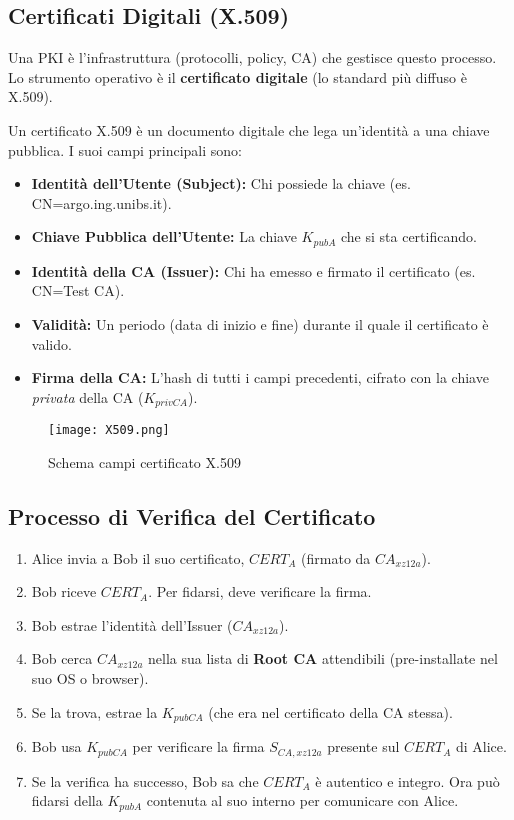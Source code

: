 \documentclass[../main.tex]{subfiles}
\begin{document}
\subsection{Certificati Digitali (X.509)}
Una PKI è l'infrastruttura (protocolli, policy, CA) che gestisce questo processo. Lo strumento operativo è il \textbf{certificato digitale} (lo standard più diffuso è X.509).

Un certificato X.509 è un documento digitale che lega un'identità a una chiave pubblica. I suoi campi principali sono:
\begin{itemize}
    \item \textbf{Identità dell'Utente (Subject):} Chi possiede la chiave (es. CN=argo.ing.unibs.it).
    \item \textbf{Chiave Pubblica dell'Utente:} La chiave $K_{pubA}$ che si sta certificando.
    \item \textbf{Identità della CA (Issuer):} Chi ha emesso e firmato il certificato (es. CN=Test CA).
    \item \textbf{Validità:} Un periodo (data di inizio e fine) durante il quale il certificato è valido.
    \item \textbf{Firma della CA:} L'hash di tutti i campi precedenti, cifrato con la chiave \emph{privata} della CA ($K_{privCA}$).
\end{itemize}

\begin{figure}[H]
  \centering
  \texttt{[image: X509.png]}
  \caption{Schema campi certificato X.509}
  \label{fig:}
\end{figure}

\subsection{Processo di Verifica del Certificato}
\begin{enumerate}
    \item Alice invia a Bob il suo certificato, $CERT_A$ (firmato da $CA_{xz12a}$).
    \item Bob riceve $CERT_A$. Per fidarsi, deve verificare la firma.
    \item Bob estrae l'identità dell'Issuer ($CA_{xz12a}$).
    \item Bob cerca $CA_{xz12a}$ nella sua lista di \textbf{Root CA} attendibili (pre-installate nel suo OS o browser).
    \item Se la trova, estrae la $K_{pubCA}$ (che era nel certificato della CA stessa).
    \item Bob usa $K_{pubCA}$ per verificare la firma $S_{CA,xz12a}$ presente sul $CERT_A$ di Alice.
    \item Se la verifica ha successo, Bob sa che $CERT_A$ è autentico e integro. Ora può fidarsi della $K_{pubA}$ contenuta al suo interno per comunicare con Alice.
\end{enumerate}
\end{document}
